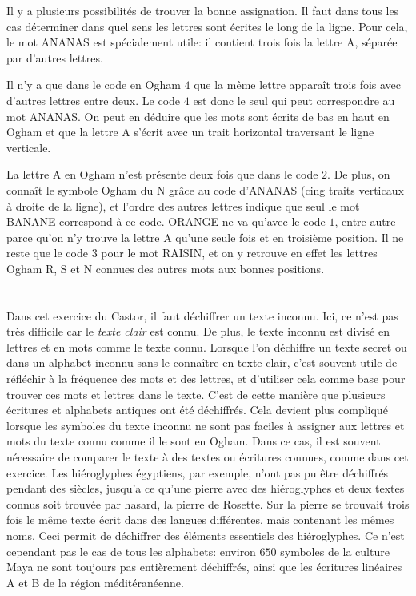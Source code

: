 {{Il y a plusieurs possibilités de trouver la bonne assignation. Il faut dans tous les cas déterminer dans quel sens les lettres sont écrites le long de la ligne. Pour cela, le mot ANANAS est spécialement utile: il contient trois fois la lettre A, séparée par d’autres lettres.

Il n’y a que dans le code en Ogham $4$ que la même lettre apparaît trois fois avec d’autres lettres entre deux. Le code $4$ est donc le seul qui peut correspondre au mot ANANAS. On peut en déduire que les mots sont écrits de bas en haut en Ogham et que la lettre A s’écrit avec un trait horizontal traversant le ligne verticale.

La lettre A en Ogham n’est présente deux fois que dans le code $2$. De plus, on connaît le symbole Ogham du N grâce au code d’ANANAS (cing traits verticaux à droite de la ligne), et l’ordre des autres lettres indique que seul le mot BANANE correspond à ce code. ORANGE ne va qu’avec le code $1$, entre autre parce qu’on n’y trouve la lettre A qu’une seule fois et en troisième position. Il ne reste que le code $3$ pour le mot RAISIN, et on y retrouve en effet les lettres Ogham R, S et N connues des autres mots aux bonnes positions.



\section*{\BrochureItsInformatics}
Dans cet exercice du Castor, il faut déchiffrer un texte inconnu. Ici, ce n’est pas très difficile car le \emph{texte clair} est connu. De plus, le texte inconnu est divisé en lettres et en mots comme le texte connu. Lorsque l’on déchiffre un texte secret ou dans un alphabet inconnu sans le connaître en texte clair, c’est souvent utile de réfléchir à la fréquence des mots et des lettres, et d’utiliser cela comme base pour trouver ces mots et lettres dans le texte. C’est de cette manière que plusieurs écritures et alphabets antiques ont été déchiffrés. Cela devient plus compliqué lorsque les symboles du texte inconnu ne sont pas faciles à assigner aux lettres et mots du texte connu comme il le sont en Ogham. Dans ce cas, il est souvent nécessaire de comparer le texte à des textes ou écritures connues, comme dans cet exercice. Les hiéroglyphes égyptiens, par exemple, n’ont pas pu être déchiffrés pendant des siècles, jusqu’a ce qu’une pierre avec des hiéroglyphes et deux textes connus soit trouvée par hasard, la pierre de Rosette. Sur la pierre se trouvait trois fois le même texte écrit dans des langues différentes, mais contenant les mêmes noms. Ceci permit de déchiffrer des éléments essentiels des hiéroglyphes. Ce n’est cependant pas le cas de tous les alphabets: environ $650$ symboles de la culture Maya ne sont toujours pas entièrement déchiffrés, ainsi que les écritures linéaires A et B de la région méditéranéenne.

}}
